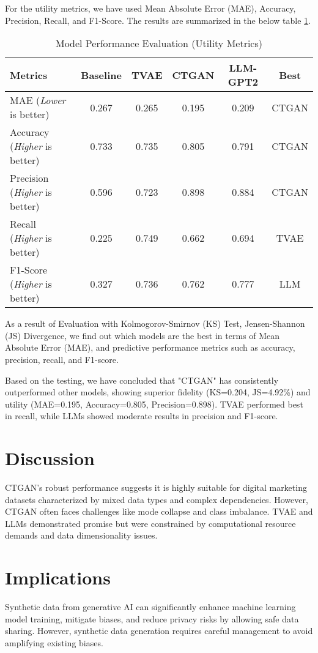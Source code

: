 \documentclass{article}
\begin{document}
For the utility metrics, we have used Mean Absolute Error (MAE), Accuracy, Precision, Recall, and F1-Score. The results are summarized in the below table \ref{tab:utility}.
\begin{table}[h!]
\centering
\renewcommand{\arraystretch}{1.3}
\begin{tabular}{|l|c|c|c|c|c|}
\hline
\rowcolor[gray]{0.9}
\textbf{Metrics} & \textbf{Baseline} & \textbf{TVAE} & \textbf{CTGAN} & \textbf{LLM-GPT2} & \textbf{Best} \\ \hline
MAE (\textit{Lower} is better) & 0.267 & 0.265 & 0.195 & 0.209 & CTGAN \\ \hline
Accuracy (\textit{Higher} is better) & 0.733 & 0.735 & 0.805 & 0.791 & CTGAN \\ \hline
Precision (\textit{Higher} is better) & 0.596 & 0.723 & 0.898 & 0.884 & CTGAN \\ \hline
Recall (\textit{Higher} is better) & 0.225 & 0.749 & 0.662 & 0.694 & TVAE \\ \hline
F1-Score (\textit{Higher} is better) & 0.327 & 0.736 & 0.762 & 0.777 & LLM \\ \hline
\end{tabular}
\caption{Model Performance Evaluation (Utility Metrics)}
\label{tab:utility}
\end{table}

As a result of Evaluation with Kolmogorov-Smirnov (KS) Test, Jensen-Shannon (JS) Divergence, we find out which models are the best in terms of Mean Absolute Error (MAE), and predictive performance metrics such as accuracy, precision, recall, and F1-score.

Based on the testing, we have concluded that "CTGAN" has consistently outperformed other models, showing superior fidelity (KS=0.204, JS=4.92\%) and utility (MAE=0.195, Accuracy=0.805, Precision=0.898). TVAE performed best in recall, while LLMs showed moderate results in precision and F1-score.

\section{Discussion}
CTGAN's robust performance suggests it is highly suitable for digital marketing datasets characterized by mixed data types and complex dependencies. However, CTGAN often faces challenges like mode collapse and class imbalance. TVAE and LLMs demonstrated promise but were constrained by computational resource demands and data dimensionality issues.

\section{Implications}
Synthetic data from generative AI can significantly enhance machine learning model training, mitigate biases, and reduce privacy risks by allowing safe data sharing. However, synthetic data generation requires careful management to avoid amplifying existing biases.
\end{document}
